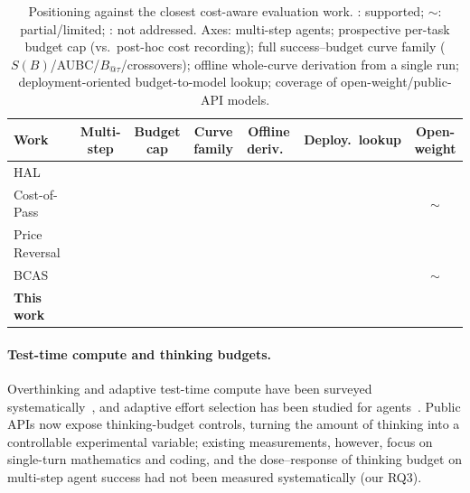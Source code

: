 \documentclass[preprint,authoryear,12pt]{elsarticle}
\newcommand{\cmark}{\ding{51}}
\newcommand{\xmark}{\ding{55}}
\newcommand{\pmark}{$\sim$}
\begin{document}
\begin{table}[t]
\centering
\caption{Positioning against the closest cost-aware evaluation work. \cmark: supported; \pmark: partial/limited; \xmark: not addressed. Axes: multi-step agents; prospective per-task budget cap (vs.\ post-hoc cost recording); full success--budget curve family ($S(B)$/AUBC/$B_{@\tau}$/crossovers); offline whole-curve derivation from a single run; deployment-oriented budget-to-model lookup; coverage of open-weight/public-API models.}
\label{tab:comparison}
\small
\begin{tabular}{l c c c c c c}
\toprule
Work & Multi-step & Budget cap & Curve family & Offline deriv.\ & Deploy.\ lookup & Open-weight \\
\midrule
HAL~\cite{kapoor2025holisticagentleaderboard} & \cmark & \xmark & \xmark & \xmark & \xmark & \xmark \\
Cost-of-Pass~\cite{erol2025costofpass} & \xmark & \xmark & \xmark & \xmark & \xmark & \pmark \\
Price Reversal~\cite{chen2026pricereversal} & \xmark & \xmark & \xmark & \xmark & \xmark & \xmark \\
BCAS~\cite{mccleary2026budgetconstrainedsearch} & \cmark & \cmark & \xmark & \xmark & \xmark & \pmark \\
\textbf{This work} & \cmark & \cmark & \cmark & \cmark & \cmark & \cmark \\
\bottomrule
\end{tabular}
\end{table}

\paragraph{Test-time compute and thinking budgets.} Overthinking and adaptive test-time compute have been surveyed systematically~\cite{alomrani2025reasoningonabudget}, and adaptive effort selection has been studied for agents~\cite{yang2026ares}. Public APIs now expose thinking-budget controls, turning the amount of thinking into a controllable experimental variable; existing measurements, however, focus on single-turn mathematics and coding, and the dose--response of thinking budget on multi-step agent success had not been measured systematically (our RQ3).
\end{document}
